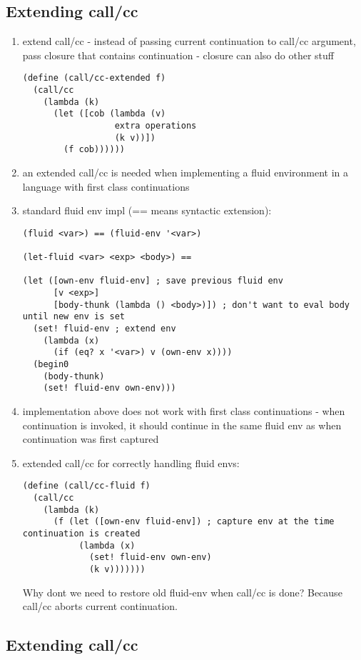 \documentclass[letterpaper]{llncs}
\begin{document}
\subsection*{Extending call/cc}

\begin{enumerate}
	\item extend call/cc - instead of passing current continuation to call/cc argument, pass closure that contains continuation - closure can also do other stuff
\begin{verbatim}
(define (call/cc-extended f)
  (call/cc
    (lambda (k)
      (let ([cob (lambda (v)
                  extra operations
                  (k v))])
        (f cob))))))
\end{verbatim}
	\item an extended call/cc is needed when implementing a fluid environment in a language with first class continuations
	\item standard fluid env impl (== means syntactic extension):
\begin{verbatim}
(fluid <var>) == (fluid-env '<var>)

(let-fluid <var> <exp> <body>) ==

(let ([own-env fluid-env] ; save previous fluid env
      [v <exp>]
      [body-thunk (lambda () <body>)]) ; don't want to eval body until new env is set
  (set! fluid-env ; extend env
    (lambda (x)
      (if (eq? x '<var>) v (own-env x))))
  (begin0
    (body-thunk)
    (set! fluid-env own-env)))
\end{verbatim}
	\item implementation above does not work with first class continuations - when continuation is invoked, it should continue in the same fluid env as when continuation was first captured
	\item extended call/cc for correctly handling fluid envs:
\begin{verbatim}
(define (call/cc-fluid f)
  (call/cc
    (lambda (k)
      (f (let ([own-env fluid-env]) ; capture env at the time continuation is created
           (lambda (x)
             (set! fluid-env own-env)
             (k v)))))))
\end{verbatim}
Why dont we need to restore old fluid-env when call/cc is done? Because call/cc aborts current continuation.
\end{enumerate}

\subsection*{Extending call/cc}
\end{document}
